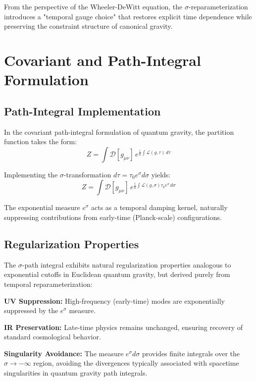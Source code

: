 \documentclass[12pt,a4paper]{article}
\begin{document}
From the perspective of the Wheeler-DeWitt equation, the $\sigma$-reparameterization introduces a "temporal gauge choice" that restores explicit time dependence while preserving the constraint structure of canonical gravity.

\section{Covariant and Path-Integral Formulation}

\subsection{Path-Integral Implementation}

In the covariant path-integral formulation of quantum gravity, the partition function takes the form:
\begin{equation}
Z = \int \mathcal{D}[g_{\mu\nu}] \, e^{\frac{i}{\hbar} \int \mathcal{L}(g, \tau) \, d\tau}
\label{eq:standard_path_integral}
\end{equation}

Implementing the $\sigma$-transformation $d\tau = \tau_0 e^{\sigma} d\sigma$ yields:
\begin{equation}
\boxed{Z = \int \mathcal{D}[g_{\mu\nu}] \, e^{\frac{i}{\hbar} \int \mathcal{L}(g, \sigma) \tau_0 e^{\sigma} \, d\sigma}}
\label{eq:sigma_path_integral}
\end{equation}

The exponential measure $e^{\sigma}$ acts as a temporal damping kernel, naturally suppressing contributions from early-time (Planck-scale) configurations.

\subsection{Regularization Properties}

The $\sigma$-path integral exhibits natural regularization properties analogous to exponential cutoffs in Euclidean quantum gravity, but derived purely from temporal reparameterization:

\textbf{UV Suppression:} High-frequency (early-time) modes are exponentially suppressed by the $e^{\sigma}$ measure.

\textbf{IR Preservation:} Late-time physics remains unchanged, ensuring recovery of standard cosmological behavior.

\textbf{Singularity Avoidance:} The measure $e^{\sigma} d\sigma$ provides finite integrals over the $\sigma \to -\infty$ region, avoiding the divergences typically associated with spacetime singularities in quantum gravity path integrals.
\end{document}
